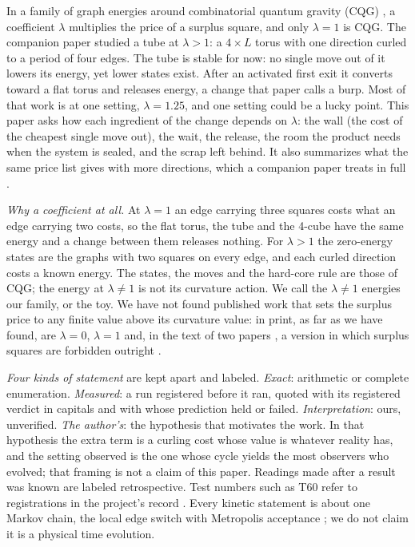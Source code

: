 \documentclass[aps,pre,10pt,twocolumn,superscriptaddress,nofootinbib]{revtex4-2}
\begin{document}
In a family of graph energies around combinatorial quantum gravity (CQG) \cite{T17,KTB19,T25}, a coefficient $\lambda$
multiplies the price of a surplus square, and only $\lambda=1$ is CQG. The companion paper \cite{paper1} studied
a tube at $\lambda>1$: a $4\times L$ torus with one direction curled to a period of four edges. The tube is
stable for now: no single move out of it lowers its energy, yet lower states exist. After an activated first
exit it converts toward a flat torus and releases energy, a change that paper calls a burp. Most of that work is at one
setting, $\lambda=1.25$, and one setting could be a lucky point. This paper asks how each ingredient of the change
depends on $\lambda$: the wall (the cost of the cheapest single move out), the wait, the release, the room the
product needs when the system is sealed, and the scrap left behind. It also summarizes what the same price list
gives with more directions, which a companion paper treats in full \cite{paper5}.

\emph{Why a coefficient at all.} At $\lambda=1$ an edge carrying three squares costs what an edge
carrying two costs, so the flat torus, the tube and the 4-cube have the same energy and a change between them
releases nothing. For $\lambda>1$ the zero-energy states are the graphs with two squares on every edge, and each
curled direction costs a known energy. The states, the moves and the hard-core rule are those of CQG; the energy
at $\lambda\neq1$ is not its curvature action. We call the $\lambda\neq1$ energies our family, or the toy. We
have not found published work that sets the surplus price to any finite value above its curvature value: in
print, as far as we have found, are $\lambda=0$, $\lambda=1$ and, in the text of two papers \cite{KTB19,KT19}, a
version in which surplus squares are forbidden outright \cite{search}.

\emph{Four kinds of statement} are kept apart and labeled. \emph{Exact}: arithmetic or complete enumeration.
\emph{Measured}: a run registered before it ran, quoted with its registered verdict in capitals and with whose
prediction held or failed. \emph{Interpretation}: ours, unverified. \emph{The author's}: the hypothesis that
motivates the work. In that hypothesis the extra term is a curling cost whose value is whatever reality has, and
the setting observed is the one whose cycle yields the most observers who evolved; that framing is not a claim of
this paper. Readings made after a result was known are labeled retrospective. Test numbers such as T60 refer to registrations in the project's record \cite{repo}. Every kinetic statement is about one Markov chain, the local edge switch with Metropolis
acceptance \cite{paper1}; we do not claim it is a physical time evolution.
\end{document}
